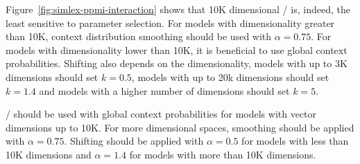 \documentclass[11pt,letterpaper]{article}
\begin{document}
Figure~\ref{fig:simlex-ppmi-interaction} shows that 10K dimensional \SPMI/ is, indeed, the least sensitive to parameter selection. For models with dimensionality greater than 10K, context distribution smoothing should be used with $\alpha = 0.75$. For models with dimensionality lower than 10K, it is beneficial to use global context probabilities. Shifting also depends on the dimensionality, models with up to 3K dimensions should set $k = 0.5$, models with up to 20k dimensions should set $k = 1.4$ and models with a higher number of dimensions should set $k = 5$.

\logNSPMI/ should be used with global context probabilities for models with vector dimensions up to 10K. For more dimensional spaces, smoothing should be applied with $\alpha = 0.75$. Shifting should be applied with $\alpha = 0.5$ for models with less than 10K dimensions and $\alpha = 1.4$ for models with more than 10K dimensions.






%

% 
\balance

\end{document}
